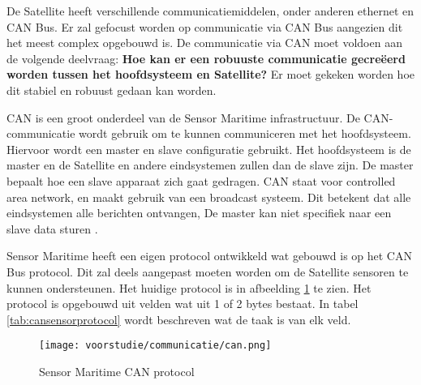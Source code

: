 De Satellite heeft verschillende communicatiemiddelen, onder anderen ethernet en CAN Bus. Er zal gefocust worden op communicatie via CAN Bus aangezien dit het meest complex opgebouwd is.  De communicatie via CAN moet voldoen aan de volgende deelvraag: \textbf{Hoe kan er een robuuste communicatie gecreëerd worden tussen het hoofdsysteem en Satellite?} Er moet gekeken worden hoe dit stabiel en robuust gedaan kan worden.\newline


\noindent CAN is een groot onderdeel van de Sensor Maritime infrastructuur. De CAN-communicatie wordt gebruik om te kunnen communiceren met het hoofdsysteem. Hiervoor wordt een master en slave configuratie gebruikt. Het hoofdsysteem is de master en de Satellite en andere eindsystemen zullen dan de slave zijn. De master bepaalt hoe een slave apparaat zich gaat gedragen. CAN staat voor controlled area network, en maakt gebruik van een broadcast systeem. Dit betekent dat alle eindsystemen alle berichten ontvangen, De master kan niet specifiek naar een slave data sturen \autocite{can}. \newline

\noindent Sensor Maritime heeft een eigen protocol ontwikkeld wat gebouwd is op het CAN Bus protocol. Dit zal deels aangepast moeten worden om de Satellite sensoren te kunnen ondersteunen. Het huidige protocol is in afbeelding \ref{fig:canprotocol} te zien. Het protocol is opgebouwd uit velden wat uit 1 of 2 bytes bestaat. In tabel \ref{tab:cansensorprotocol} wordt beschreven wat de taak is van elk veld.
\begin{figure}[h!]
	\centering
	\label{fig:canprotocol}
	\texttt{[image: voorstudie/communicatie/can.png]}
	\caption{Sensor Maritime CAN protocol}
\end{figure}

